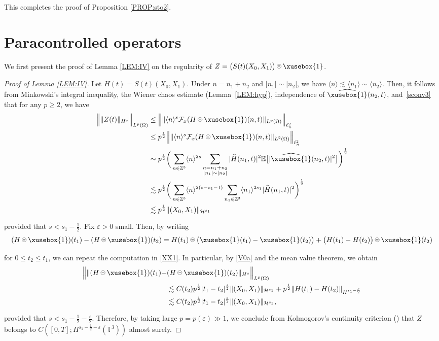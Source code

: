 \documentclass[%
11pt,  reqno]{amsart}
\def\<#1>{\xusebox{#1}}
\newcommand{\pe}{\mathbin{\scaleobj{0.7}{\tikz \draw (0,0) node[shape=circle,draw,inner sep=0pt,minimum size=8.5pt] {\scriptsize  $=$};}}}
\newcommand{\1}{\hspace{0.2mm}\text{I}\hspace{0.2mm}}
\newcommand{\noi}{\noindent}
\newcommand{\Z}{\mathbb{Z}}
\newcommand{\T}{\mathbb{T}}
\newcommand{\E}{\mathbb{E}}
\newcommand{\F}{\mathcal{F}}
\newcommand{\eps}{\varepsilon}
\newcommand{\ft}{\widehat}
\renewcommand{\l}{\ell}
\renewcommand{\O}{\Omega}
\newcommand{\les}{\lesssim}
\newcommand{\jb}[1]
{\langle #1 \rangle}
\renewcommand{\H}{\mathcal{H}}
\numberwithin{equation}{section}
\numberwithin{theorem}{section}
\begin{document}
This completes the proof of Proposition \ref{PROP:sto2}.



\section{Paracontrolled operators}
\label{SEC:po}

We first present the proof of 
Lemma \ref{LEM:IV} on the regularity of $Z = \big(S(t) (X_0,   X_1)\big) \pe \<1> $.

\begin{proof}[Proof of Lemma \ref{LEM:IV}]
Let $H(t) = S(t) (X_0, X_1)$.
Under
$n = n_1 + n_2$ and $|n_1|\sim |n_2|$, 
we have $\jb{n} \les \jb{n_1} \sim \jb{n_2}$.
Then, it follows from   Minkowski's integral inequality, 
the Wiener chaos estimate (Lemma~\ref{LEM:hyp}), 
independence of $\ft{\<1>}(n_2, t)$, and~\eqref{sconv3}
that for any $p \geq 2$,  we have
\begin{align}
\Big\|\| Z (t) \|_{H^s} \Big\|_{L^p(\O)}
& \le \Big\| \| \jb{n}^{s} \F_x (H \pe \<1>) (n, t) \|_{L^p(\O)} \Big\|_{\l^2_n}\notag\\
& \leq p^\frac{1}{2}
 \Big\| \| \jb{n}^{s} \F_x (H \pe \<1>) (n, t) \|_{L^2(\O)} \Big\|_{\l^2_n}\notag\\
&  \sim p^\frac{1}{2}  
\bigg(\sum_{n \in \Z^3} 
\jb{n}^{2s}
\sum_{\substack{n = n_1 + n_2\\|n_1|\sim |n_2|}}
 |\ft H (n_1, t)|^2 
\E\big[|\ft{\<1>}(n_2, t)|^2 \big] \bigg)^\frac{1}{2}\notag\\
&  \les   p^\frac{1}{2}
\bigg( \sum_{n \in \Z^3} 
\jb{n}^{2(s - s_1 - 1)}
\sum_{n_1 \in \Z^3}
 \jb{n_1}^{2s_1} |\ft H (n_1, t)|^2 \bigg)^\frac{1}{2}
\notag\\
& \les  p^\frac{1}{2}
\| (X_0, X_1) \|_{\H^{s_1}}
\label{XX1}
\end{align}

\noi
provided that $s < s_1 - \frac 12$.
Fix $\eps > 0$ small.
Then, 
by writing
\[(H \pe \<1>) (t_1)- (H \pe \<1>) (t_2)
= H(t_1) \pe \big(\<1> (t_1) - \<1>(t_2)\big)
+ \big(H(t_1) - H(t_2) \big) \pe \<1> (t_2)\]

\noi
for $0 \leq t_2 \leq t_1$, 
we can repeat the computation in \eqref{XX1}.
In particular, by 
 \eqref{V0a} and the mean value theorem, we obtain
\begin{align*}
\Big\|\| (H \pe \<1>) (t_1)  - & (H \pe \<1>) (t_2) \|_{H^s} \Big\|_{L^p(\O)}\\
& \les  C(t_2) p^\frac{1}{2} |t_1 - t_2|^\frac{\eps}{2}
\| (X_0, X_1) \|_{\H^{s_1}}
+ p^\frac{1}{2} \| H (t_1) - H (t_2) \|_{H^{s_1-\frac{\eps}{2}}}\\
& \les  C(t_2) p^\frac{1}{2} |t_1 - t_2|^\frac{\eps}{2}
\| (X_0, X_1) \|_{\H^{s_1}}, 
\end{align*}

\noi
provided that $s < s_1 - \frac 12 - \frac{\eps}{2}$.
Therefore, by taking large $p = p(\eps) \gg1 $, 
we conclude from Kolmogorov's continuity criterion
(\cite[Theorem 8.2]{Bass})
that 
$Z$ belongs to 
$C([0,T];H^{ s_1 - \frac 12 -\eps}(\T^3))$
almost surely.
\end{proof}
	
\end{document}
